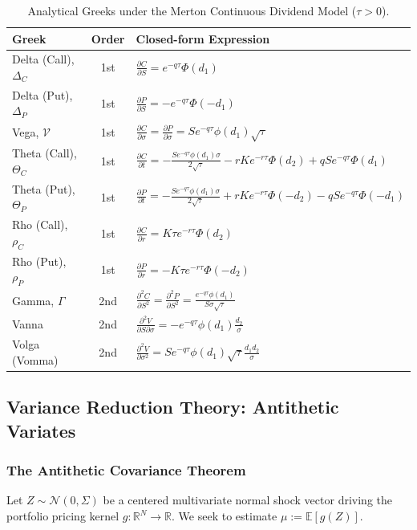 \documentclass{article}
\theoremstyle{plain}
\theoremstyle{definition}
\theoremstyle{remark}
\begin{document}
\begin{table}[htbp]
\centering
\large
\caption{Analytical Greeks under the Merton Continuous Dividend Model ($\tau > 0$).}
\label{tab:bsm_greeks}
\begin{tabular}{l c l}
\hline
\textbf{Greek} & \textbf{Order} & \textbf{Closed-form Expression} \\
\hline
Delta (Call), $\Delta_C$ & 1st & $\frac{\partial C}{\partial S} = e^{-q\tau}\Phi(d_1)$ \\
Delta (Put), $\Delta_P$ & 1st & $\frac{\partial P}{\partial S} = -e^{-q\tau}\Phi(-d_1)$ \\
Vega, $\mathcal{V}$ & 1st & $\frac{\partial C}{\partial \sigma} = \frac{\partial P}{\partial \sigma} = S e^{-q\tau}\phi(d_1)\sqrt{\tau}$ \\
Theta (Call), $\Theta_C$ & 1st & $\frac{\partial C}{\partial t} = -\frac{S e^{-q\tau}\phi(d_1)\sigma}{2\sqrt{\tau}} - r K e^{-r\tau}\Phi(d_2) + q S e^{-q\tau}\Phi(d_1)$ \\
Theta (Put), $\Theta_P$ & 1st & $\frac{\partial P}{\partial t} = -\frac{S e^{-q\tau}\phi(d_1)\sigma}{2\sqrt{\tau}} + r K e^{-r\tau}\Phi(-d_2) - q S e^{-q\tau}\Phi(-d_1)$ \\
Rho (Call), $\rho_C$ & 1st & $\frac{\partial C}{\partial r} = K \tau e^{-r\tau}\Phi(d_2)$ \\
Rho (Put), $\rho_P$ & 1st & $\frac{\partial P}{\partial r} = -K \tau e^{-r\tau}\Phi(-d_2)$ \\
Gamma, $\Gamma$ & 2nd & $\frac{\partial^2 C}{\partial S^2} = \frac{\partial^2 P}{\partial S^2} = \frac{e^{-q\tau}\phi(d_1)}{S\sigma\sqrt{\tau}}$ \\
Vanna & 2nd & $\frac{\partial^2 V}{\partial S\partial\sigma} = -e^{-q\tau}\phi(d_1)\frac{d_2}{\sigma}$ \\
Volga (Vomma) & 2nd & $\frac{\partial^2 V}{\partial\sigma^2} = S e^{-q\tau}\phi(d_1)\sqrt{\tau}\frac{d_1 d_2}{\sigma}$ \\
\hline
\end{tabular}
\end{table}

\subsection{Variance Reduction Theory: Antithetic Variates}

\subsubsection{The Antithetic Covariance Theorem}
Let $Z \sim \mathcal{N}(0, \Sigma)$ be a centered multivariate normal shock vector driving the portfolio pricing kernel $g: \mathbb{R}^N \to \mathbb{R}$. We seek to estimate $\mu := \mathbb{E}[g(Z)]$.
\end{document}
